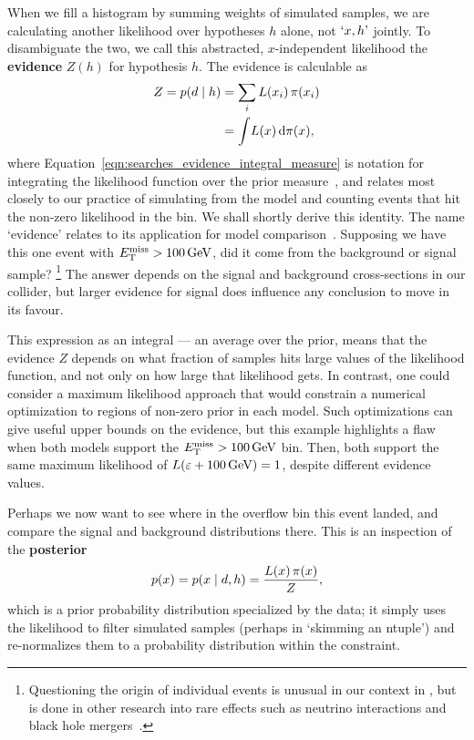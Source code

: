 When we fill a histogram by summing weights of simulated samples, we are
calculating another likelihood over hypotheses $h$ alone, not $`x, h\textrm{'}$
jointly.
To disambiguate the two, we call this abstracted, $x$-independent likelihood
the \textbf{evidence} $Z(h)$ for hypothesis $h$.
The evidence is calculable as
\begin{align}
Z
= \prob{d}{h} &= \sum_i L(x_i) \,\pi(x_i)
\label{eqn:searches_evidence_integral_sum}
\\
&= \int\! L(x) \,\mathrm{d}\pi(x),
\label{eqn:searches_evidence_integral_measure}
\end{align}
where Equation~\ref{eqn:searches_evidence_integral_measure} is notation for
integrating the likelihood function over the prior measure~\cite{
billingsley2008probability,
skilling2010foundations
}, and relates most closely to our practice of simulating from the model and
counting events that hit the non-zero likelihood in the bin.
We shall shortly derive this identity.
The name `evidence' relates to its application for model
comparison~\cite{mackay2003information}.
Supposing we have this one event with $\met > 100\,\eV[G]$, did it come from
the background or signal sample?%
\footnote{%
Questioning the origin of individual events is unusual in our context in
\atlas, but is done in other research into rare effects such as neutrino
interactions and black hole mergers~\cite{
opera2010event,
icecube2020event,
Abbott2021event
}.%
}
The answer depends on the signal and background cross-sections in our collider,
but larger evidence for signal does influence any conclusion to move in its
favour.

This expression as an integral --- an average over the prior, means that
the evidence $Z$ depends on what fraction of samples hits large values of
the likelihood function, and not only on how large that likelihood gets.
In contrast, one could consider a maximum likelihood approach that would
constrain a numerical optimization to regions of non-zero prior in each model.
Such optimizations can give useful upper bounds on the evidence, but this
example highlights a flaw when both models support the $\met > 100\,\eV[G]$
bin.
Then, both support the same maximum likelihood of
$L(\varepsilon + 100\,\eV[G]) = 1$, despite different evidence values.

Perhaps we now want to see where in the overflow bin this event landed, and
compare the signal and background distributions there.
This is an inspection of the \textbf{posterior}
\begin{equation}
p(x) = \prob{x}{d, h} = \frac{L(x)\,\pi(x)}{Z},
\end{equation}
which is a prior probability distribution specialized by the data;
it simply uses the likelihood to filter simulated samples
(perhaps in `skimming an ntuple')
and re-normalizes them to a probability distribution within the constraint.

